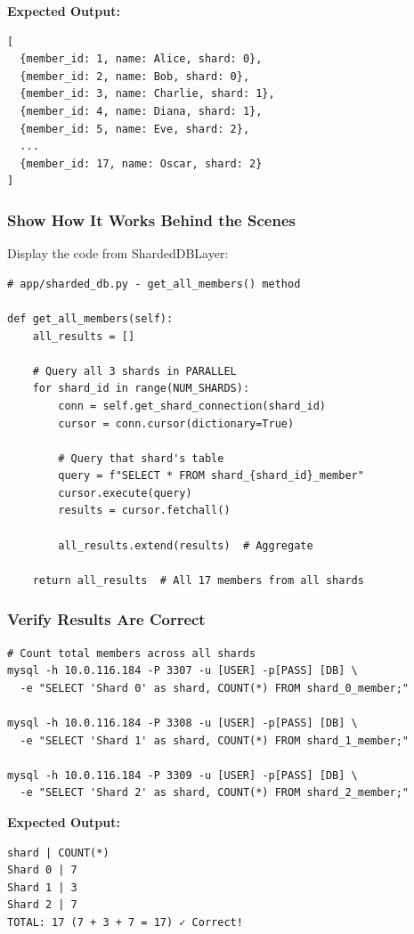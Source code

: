 \documentclass[12pt]{article}
\begin{document}
\textbf{Expected Output:}
\begin{lstlisting}
[
  {member_id: 1, name: Alice, shard: 0},
  {member_id: 2, name: Bob, shard: 0},
  {member_id: 3, name: Charlie, shard: 1},
  {member_id: 4, name: Diana, shard: 1},
  {member_id: 5, name: Eve, shard: 2},
  ...
  {member_id: 17, name: Oscar, shard: 2}
]
\end{lstlisting}

\subsubsection*{Show How It Works Behind the Scenes}

Display the code from ShardedDBLayer:

\begin{lstlisting}
# app/sharded_db.py - get_all_members() method

def get_all_members(self):
    all_results = []
    
    # Query all 3 shards in PARALLEL
    for shard_id in range(NUM_SHARDS):
        conn = self.get_shard_connection(shard_id)
        cursor = conn.cursor(dictionary=True)
        
        # Query that shard's table
        query = f"SELECT * FROM shard_{shard_id}_member"
        cursor.execute(query)
        results = cursor.fetchall()
        
        all_results.extend(results)  # Aggregate
    
    return all_results  # All 17 members from all shards
\end{lstlisting}

\subsubsection*{Verify Results Are Correct}

\begin{lstlisting}
# Count total members across all shards
mysql -h 10.0.116.184 -P 3307 -u [USER] -p[PASS] [DB] \
  -e "SELECT 'Shard 0' as shard, COUNT(*) FROM shard_0_member;"

mysql -h 10.0.116.184 -P 3308 -u [USER] -p[PASS] [DB] \
  -e "SELECT 'Shard 1' as shard, COUNT(*) FROM shard_1_member;"

mysql -h 10.0.116.184 -P 3309 -u [USER] -p[PASS] [DB] \
  -e "SELECT 'Shard 2' as shard, COUNT(*) FROM shard_2_member;"
\end{lstlisting}

\textbf{Expected Output:}
\begin{lstlisting}
shard | COUNT(*)
Shard 0 | 7
Shard 1 | 3
Shard 2 | 7
TOTAL: 17 (7 + 3 + 7 = 17) ✓ Correct!
\end{lstlisting}
\end{document}
